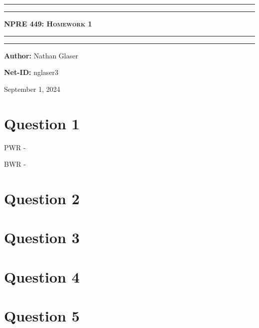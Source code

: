 \documentclass{article}
\begin{document}
\begin{titlepage}

\centering
\scshape
\vspace{\baselineskip}

%
\rule{\textwidth}{1.6pt}\vspace*{-\baselineskip}\vspace*{2pt}
\rule{\textwidth}{0.4pt}

{\Huge \textbf{\textsc{NPRE 449: Homework 1 \\
\vspace{15pt}}}}

\rule{\textwidth}{0.4pt}\vspace*{-\baselineskip}\vspace{3.2pt}
\rule{\textwidth}{1.6pt}\vspace{6pt}
\vspace{1.5\baselineskip}


\large \centerline{\textbf{Author:} Nathan Glaser}
\large \centerline{\textbf{Net-ID:} nglaser3}
\quad

\vfill
\large \centerline{September 1, 2024}
%
\end{titlepage}

\tableofcontents
\newpage
{}


\section{Question 1}
PWR - 

BWR - 



\section{Question 2}

\section{Question 3}

\section{Question 4}

\section{Question 5}
\end{document}

